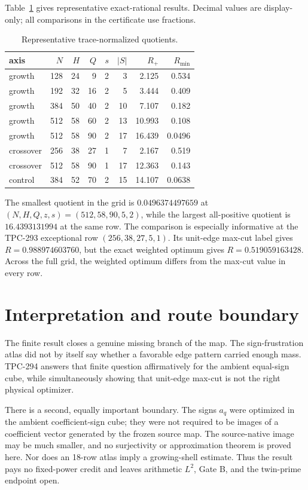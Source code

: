 \documentclass[10pt]{article}
\begin{document}
Table~\ref{tab:rows} gives representative exact-rational results.  Decimal
values are display-only; all comparisons in the certificate use fractions.

\begin{table}[ht]
\centering
\scriptsize
\caption{Representative trace-normalized quotients.}
\label{tab:rows}
\begin{tabular}{@{}lrrrrrrr@{}}
\toprule
axis & $N$ & $H$ & $Q$ & $s$ & $|S|$ & $R_{+}$ & $R_{\min}$\\
\midrule
growth &128&24&9 &2&3 &2.125&0.534\\
growth &192&32&16&2&5 &3.444&0.409\\
growth &384&50&40&2&10&7.107&0.182\\
growth &512&58&60&2&13&10.993&0.108\\
growth &512&58&90&2&17&16.439&0.0496\\
crossover&256&38&27&1&7 &2.167&0.519\\
crossover&512&58&90&1&17&12.363&0.143\\
control &384&52&70&2&15&14.107&0.0638\\
\bottomrule
\end{tabular}
\end{table}

The smallest quotient in the grid is
$0.0496374497659$ at $(N,H,Q,z,s)=(512,58,90,5,2)$, while the largest
all-positive quotient is $16.4393131994$ at the same row.  The comparison is
especially informative at the TPC-293 exceptional row
$(256,38,27,5,1)$.  Its unit-edge max-cut label gives
$R=0.988974603760$, but the exact weighted optimum gives
$R=0.519059163428$.  Across the full grid, the weighted optimum differs from
the max-cut value in every row.

\section{Interpretation and route boundary}

The finite result closes a genuine missing branch of the map.  The
sign-frustration atlas did not by itself say whether a favorable edge pattern
carried enough mass.  TPC-294 answers that finite question affirmatively for
the ambient equal-sign cube, while simultaneously showing that unit-edge
max-cut is not the right physical optimizer.

There is a second, equally important boundary.  The signs $a_q$ were
optimized in the ambient coefficient-sign cube; they were not required to be
images of a coefficient vector generated by the frozen source map.  The
source-native image may be much smaller, and no surjectivity or approximation
theorem is proved here.  Nor does an 18-row atlas imply a growing-shell
estimate.  Thus the result pays no fixed-power credit and leaves arithmetic
$L^2$, Gate B, and the twin-prime endpoint open.
\end{document}
